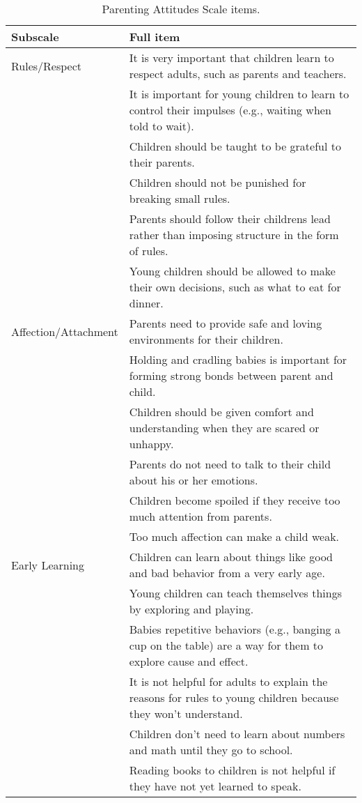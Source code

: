 \documentclass[10pt, letterpaper]{article}
\begin{document}
\begin{table*}[t]
\centering
\begin{tabular}{p{1.25in}p{5.25in}}
  \hline
Subscale & Full item \\ 
  \hline
Rules/Respect & It is very important that children learn to respect adults, such as parents and teachers. \\ 
   & It is important for young children to learn to control their impulses (e.g., waiting when told to wait). \\ 
  & Children should be taught to be grateful to their parents. \\ 
  & Children should not be punished for breaking small rules. \\ 
  & Parents should follow their childrens lead rather than imposing structure in the form of rules. \\ 
  & Young children should be allowed to make their own decisions, such as what to eat for dinner. \\ 
  Affection/Attachment & Parents need to provide safe and loving environments for their children. \\ 
   & Holding and cradling babies is important for forming strong bonds between parent and child. \\ 
   & Children should be given comfort and understanding when they are scared or unhappy. \\ 
   & Parents do not need to talk to their child about his or her emotions. \\ 
   & Children become spoiled if they receive too much attention from parents. \\ 
   & Too much affection can make a child weak. \\ 
  Early Learning & Children can learn about things like good and bad behavior from a very early age. \\ 
   & Young children can teach themselves things by exploring and playing. \\ 
   & Babies repetitive behaviors (e.g., banging a cup on the table) are a way for them to explore cause and effect. \\ 
   & It is not helpful for adults to explain the reasons for rules to young children because they won't understand. \\ 
   & Children don't need to learn about numbers and math until they go to school. \\ 
   & Reading books to children is not helpful if they have not yet learned to speak. \\ 
   \hline
\end{tabular}
\caption{Parenting Attitudes Scale items.\label{tab:items}} 
\end{table*}
\end{document}
